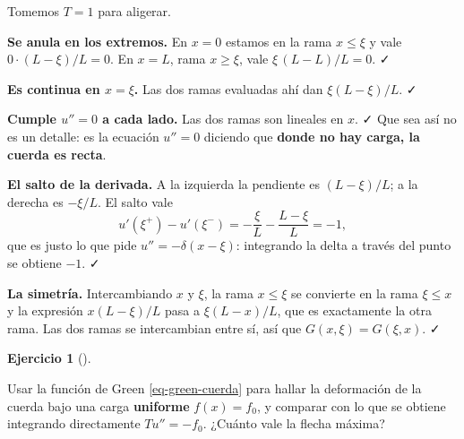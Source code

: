 \documentclass[
  spanish,
  a4paper,
]{scrbook}
\theoremstyle{definition}
\theoremstyle{plain}
\theoremstyle{definition}
\theoremstyle{plain}
\theoremstyle{definition}
\newtheorem{exercise}{Ejercicio}[chapter]
\theoremstyle{remark}
\begin{document}
\begin{tcolorbox}[enhanced jigsaw, arc=.35mm, bottomrule=.15mm, bottomtitle=1mm, breakable, colback=white, colbacktitle=quarto-callout-tip-color!10!white, colframe=quarto-callout-tip-color-frame, coltitle=black, left=2mm, leftrule=.75mm, opacityback=0, opacitybacktitle=0.6, rightrule=.15mm, title=\textcolor{quarto-callout-tip-color}{\faLightbulb}\hspace{0.5em}{Solución}, titlerule=0mm, toprule=.15mm, toptitle=1mm]

Tomemos \(T=1\) para aligerar.

\textbf{Se anula en los extremos.} En \(x=0\) estamos en la rama
\(x\le\xi\) y vale \(0\cdot(L-\xi)/L = 0\). En \(x=L\), rama
\(x\ge\xi\), vale \(\xi\,(L-L)/L = 0\). ✓

\textbf{Es continua en \(x=\xi\).} Las dos ramas evaluadas ahí dan
\(\xi(L-\xi)/L\). ✓

\textbf{Cumple \(u''=0\) a cada lado.} Las dos ramas son lineales en
\(x\). ✓ Que sea así no es un detalle: es la ecuación \(u''=0\) diciendo
que \textbf{donde no hay carga, la cuerda es recta}.

\textbf{El salto de la derivada.} A la izquierda la pendiente es
\((L-\xi)/L\); a la derecha es \(-\xi/L\). El salto vale \[
u'(\xi^+) - u'(\xi^-) = -\frac{\xi}{L} - \frac{L-\xi}{L} = -1 ,
\] que es justo lo que pide \(u'' = -\delta(x-\xi)\): integrando la
delta a través del punto se obtiene \(-1\). ✓

\textbf{La simetría.} Intercambiando \(x\) y \(\xi\), la rama
\(x\le\xi\) se convierte en la rama \(\xi \le x\) y la expresión
\(x(L-\xi)/L\) pasa a \(\xi(L-x)/L\), que es exactamente la otra rama.
Las dos ramas se intercambian entre sí, así que \(G(x,\xi)=G(\xi,x)\). ✓

\end{tcolorbox}

\begin{exercise}[]\protect\hypertarget{exr-green-uniforme}{}\label{exr-green-uniforme}

Usar la función de Green \ref{eq-green-cuerda} para hallar la
deformación de la cuerda bajo una carga \textbf{uniforme}
\(f(x) = f_0\), y comparar con lo que se obtiene integrando directamente
\(T u'' = -f_0\). ¿Cuánto vale la flecha máxima?

\end{exercise}
\end{document}
